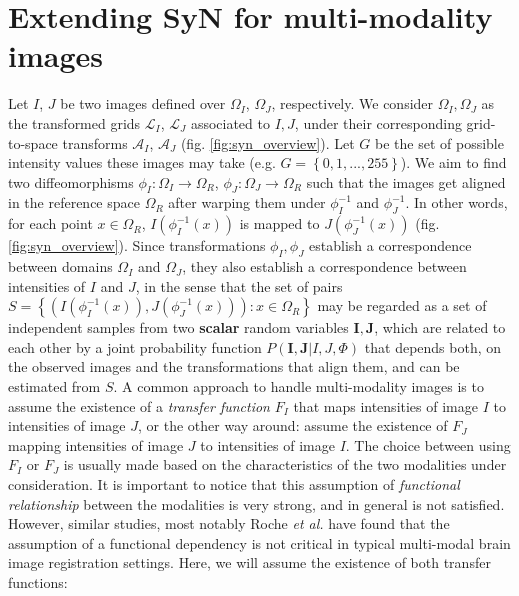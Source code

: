 \section{Extending SyN for multi-modality images}\label{sec:syn_em}

Let $I$, $J$ be two images defined over $\Omega_{I}$, $\Omega_{J}$, respectively. We consider $\Omega_{I}, \Omega_{J}$ as the transformed grids $\mathcal{L}_{I}$, $\mathcal{L}_{J}$
associated to $I, J$, under their corresponding grid-to-space transforms $\mathcal{A}_{I}$, $\mathcal{A}_{J}$ (fig. \ref{fig:syn_overview}). Let $G$ be the set of possible intensity values these images may take (e.g. $G=\left\lbrace 0,1,...,255\right\rbrace$). We aim to find two diffeomorphisms $\phi_{I}:\Omega_{I}\rightarrow \Omega_{R}$, $\phi_{J}:\Omega_{J}\rightarrow \Omega_{R}$ such that the images get aligned in the reference space $\Omega_{R}$ after warping them under $\phi_{I}^{-1}$ and $\phi_{J}^{-1}$. In other words, for each point $x \in \Omega_{R}$, $I(\phi_{I}^{-1}(x))$ is mapped to $J(\phi_{J}^{-1}(x))$
(fig. \ref{fig:syn_overview}). Since transformations $\phi_{I}, \phi_{J}$ establish a correspondence between domains $\Omega_{I}$ and $\Omega_{J}$, they also establish a correspondence between intensities of $I$ and $J$, in the sense that the set of pairs $S = \left\lbrace \left( I(\phi_{I}^{-1}(x)), J(\phi_{J}^{-1}(x))\right): x\in\Omega_{R}\right\rbrace$ may be regarded as a set of independent samples from two \textbf{scalar} random variables $\mathbf{I}, \mathbf{J}$, which are related to each other by a joint probability function $P(\mathbf{I}, \mathbf{J} | I, J, \Phi)$ that depends both, on the observed images and the transformations that align them, and can be estimated from $S$. A common approach to handle multi-modality images is to assume the existence of a \emph{transfer function} $F_{I}$ that maps intensities of image $I$ to intensities of image $J$, or the other way around: assume the existence of $F_{J}$ mapping intensities of image $J$ to intensities of image $I$. The choice between using $F_{I}$ or $F_{J}$ is usually made based on the characteristics of the two modalities under consideration. It is important to notice that this assumption of \emph{functional relationship} between the modalities is very strong, and in general is not satisfied. However, similar studies, most notably Roche {\it et al.} \cite{Roche1998} have found that the assumption of a functional dependency is not critical in typical multi-modal brain image registration settings. Here, we will assume the existence of both transfer functions:
